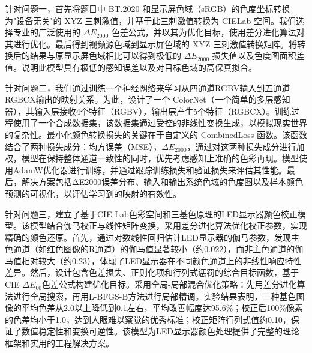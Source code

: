 \begin{cabstract}	%
针对问题一，首先将题目中 BT.2020 和显示屏色域（sRGB）的色度坐标转换为"设备无关"的 XYZ 三刺激值，并基于此三刺激值转换为 CIELab 空间。我们选择专业的广泛使用的 $\Delta E_{2000}$ 色差公式，并以其为优化目标，使用差分进化算法对其进行优化。最后得到视频源色域到显示屏色域的 XYZ 三刺激值转换矩阵。将转换后的结果与原显示屏色域相比可以得到极低的 $\Delta E_{2000}$ 损失值以及色度图面积差值。说明此模型具有极低的感知误差以及对目标色域的高保真拟合。

针对问题二，我们通过训练一个神经网络来学习从四通道RGBV输入到五通道RGBCX输出的映射关系。为此，设计了一个 ColorNet（一个简单的多层感知器），其输入层接收4个特征（RGBV），输出层产生5个特征（RGBCX）。训练过程使用了一个合成数据集，该数据集通过受控的非线性变换生成，以模拟现实世界的复杂性。最小化颜色转换损失的关键在于自定义的 CombinedLoss 函数。该函数结合了两种损失成分：均方误差（MSE），$\Delta E_{2000}$，通过对这两种损失成分进行加权，模型在保持整体通道一致性的同时，优先考虑感知上准确的色彩再现。模型使用AdamW优化器进行训练，并通过跟踪训练损失和验证损失来评估其性能。最后，解决方案包括ΔE2000误差分布、输入和输出系统色域的色度图以及样本颜色预测的可视化，以评估学习到的映射的有效性。

针对问题三，建立了基于CIE Lab色彩空间和三基色原理的LED显示器颜色校正模型。该模型结合伽马校正与线性矩阵变换，采用差分进化算法优化校正参数，实现精确的颜色还原。首先，通过对数线性回归估计LED显示器的伽马参数，发现主色通道（如红色图像的R通道）的伽马值显著较小（约0.022），而非主色通道的伽马值相对较大（约0.23），体现了LED显示器在不同颜色通道上的非线性响应特性差异。然后，设计包含色差损失、正则化项和行列式惩罚的综合目标函数，基于CIE $\Delta E_{00}$色差公式构建优化目标。采用全局-局部混合优化策略：先用差分进化算法进行全局搜索，再用L-BFGS-B方法进行局部精调。实验结果表明，三种基色图像的平均色差从2.0以上降低到0.1左右，平均改善幅度达95.6\%；校正后100\%像素的色差均小于1.0，达到人眼难以察觉的优秀标准；校正矩阵行列式值约0.10，保证了数值稳定性和变换可逆性。该模型为LED显示器颜色处理提供了完整的理论框架和实用的工程解决方案。
\end{cabstract}

